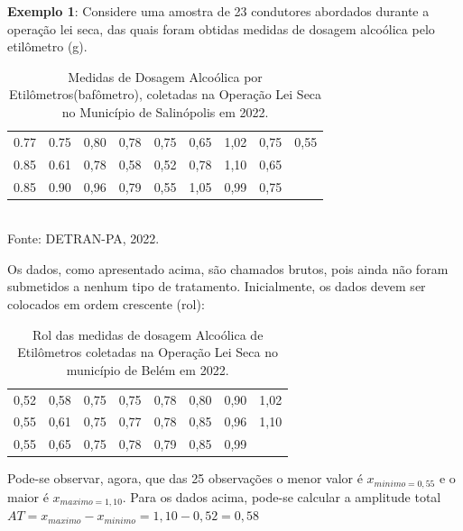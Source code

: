 \newpage

\textbf{Exemplo 1}: Considere uma amostra de 23 condutores abordados durante a operação lei seca, das
quais foram obtidas medidas de dosagem alcoólica pelo etilômetro (g).\vskip0.3cm


\begin{table}[!htb]
    \centering
    {
    \caption{Medidas de Dosagem Alcoólica por Etilômetros(bafômetro), coletadas na Operação Lei Seca no Município de Salinópolis em 2022.}
    \label{estatura}
    \vspace{0.2cm}
\begin{tabular}{c|c|c|c|c|c|c|c|c}
  \hline\hline
  0.77 & 0.75 & 0,80 & 0,78 & 0,75 & 0,65 & 1,02 & 0,75 & 0,55 \\
  0.85 & 0.61 & 0,78 & 0,58 & 0,52 & 0,78 & 1,10 & 0,65 &    \\
  0.85 & 0.90 & 0,96 & 0,79 & 0,55 & 1,05 & 0,99 & 0,75 &    \\
  \hline\hline
\end{tabular}}
\\
\hspace{-5.5cm}
Fonte: DETRAN-PA, 2022.
\end{table}

Os dados, como apresentado acima, são chamados brutos, pois ainda não foram submetidos a nenhum tipo de tratamento. Inicialmente, os dados devem ser colocados em ordem crescente (rol):


\begin{table}[!htb]
    \centering
    {
    \caption{Rol das medidas de dosagem Alcoólica de Etilômetros coletadas na Operação Lei Seca no município de Belém em 2022.}
    \label{estatura}
    \vspace{0.2cm}
\begin{tabular}{c|c|c|c|c|c|c|c}
  \hline\hline
  0,52 & 0,58 & 0,75 & 0,75 & 0,78 & 0,80 & 0,90 & 1,02 \\
  0,55 & 0,61 & 0,75 & 0,77 & 0,78 & 0,85 & 0,96 & 1,10  \\
  0,55 & 0,65 & 0,75 & 0,78 & 0,79 & 0,85 & 0,99 &     \\
  \hline\hline
\end{tabular}}
\end{table}



Pode-se observar, agora, que das 25 observações o menor valor é $x_{minimo = 0,55}$ e o maior é $x_{maximo= 1,10}$. Para os dados acima, pode-se calcular a amplitude total $AT = x_{maximo}-x_{minimo}=1,10-0,52=0,58$
\\



